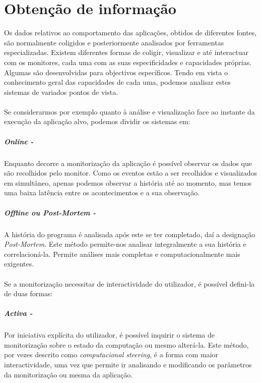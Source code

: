 \section{Obtenção de informação}\label{sect:instrumentation_overview}

Os dados relativos ao comportamento das aplicações, obtidos de diferentes fontes, são normalmente coligidos e posteriormente analisados por ferramentas especializadas.
Existem diferentes formas de coligir, visualizar e até interactuar com os monitores, cada uma com as suas especificidades e capacidades próprias.
Algumas são desenvolvidas para objectivos específicos.
Tendo em vista o conhecimento geral das capacidades de cada uma, podemos analisar estes sistemas de variados pontos de vista.

\paragraph*{}
Se considerarmos por exemplo quanto à análise e visualização face ao instante da execução da aplicação alvo, podemos dividir os sistemas em:
 
\subparagraph*{Online -}
Enquanto decorre a monitorização da aplicação é possível observar os dados que são recolhidos pelo monitor.
Como os eventos estão a ser recolhidos e visualizados em simultâneo, apenas podemos observar a história até ao momento, mas temos uma baixa latência entre os acontecimentos e a sua observação.

\subparagraph*{Offline ou \textit{Post-Mortem} - }

A história do programa é analisada após este se ter completado, daí a designação \textit{Post-Mortem}.
Este método permite-nos analisar integralmente a sua história e correlacioná-la.
Permite análises mais completas e computacionalmente mais exigentes.

\paragraph*{}

Se a monitorização necessitar de interactividade do utilizador, é possível defini-la de duas formas:

\subparagraph*{Activa - }

Por iniciativa explícita do utilizador, é possível inquirir o sistema de monitorização sobre o estado da computação ou mesmo alterá-la.
Este método, por vezes descrito como \textit{computacional steering}, é a forma com maior interactividade, uma vez que permite ir analisando e modificando os parâmetros da monitorização ou mesma da aplicação.

